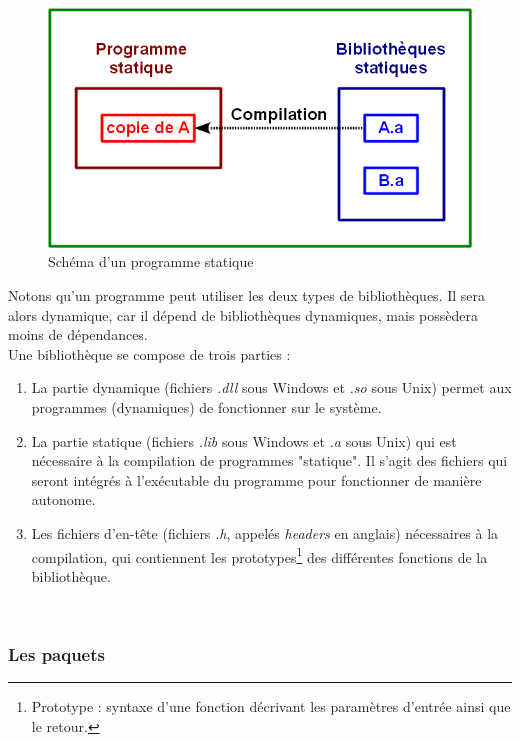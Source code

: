 \begin{figure}[!h]
	\center
	\includegraphics[scale=0.5]{img/Bibliotheque_statique.png}
	\caption{Schéma d'un programme statique}
	\label{Schéma Bibliothèque statique}
\end{figure}

Notons qu'un programme peut utiliser les deux types de bibliothèques.
Il sera alors dynamique, car il dépend de bibliothèques dynamiques, mais possèdera moins de dépendances.
\\


Une bibliothèque se compose de trois parties :
\begin{enumerate}
	\item La partie dynamique (fichiers \textit{.dll} sous Windows et \textit{.so} sous Unix) permet aux programmes (dynamiques) de fonctionner sur le système.
	\item La partie statique (fichiers \textit{.lib} sous Windows et \textit{.a} sous Unix) qui est nécessaire à la compilation de programmes "statique".
Il s'agit des fichiers qui seront intégrés à l'exécutable du programme pour fonctionner de manière autonome.
	\item Les fichiers d'en-tête (fichiers \textit{.h}, appelés \textit{headers} en anglais) nécessaires à la compilation, qui contiennent les prototypes\footnote{Prototype : syntaxe d'une fonction décrivant les paramètres d'entrée ainsi que le retour.} des différentes fonctions de la bibliothèque.
\end{enumerate}
~~\\




\subsubsection{Les paquets}

